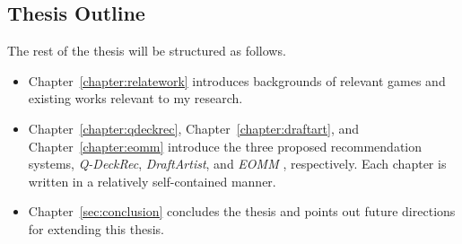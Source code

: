 \subsection{Thesis Outline}
The rest of the thesis will be structured as follows. 
\begin{itemize}
\item Chapter~\ref{chapter:relatework} introduces backgrounds of relevant games and existing works relevant to my research. 
\item Chapter~\ref{chapter:qdeckrec}, Chapter~\ref{chapter:draftart}, and Chapter~\ref{chapter:eomm} introduce the three proposed recommendation systems, \textit{Q-DeckRec}, \textit{DraftArtist}, and \textit{EOMM} , respectively. Each chapter is written in a relatively self-contained manner.
\item Chapter~\ref{sec:conclusion} concludes the thesis and points out future directions for extending this thesis.
\end{itemize}

